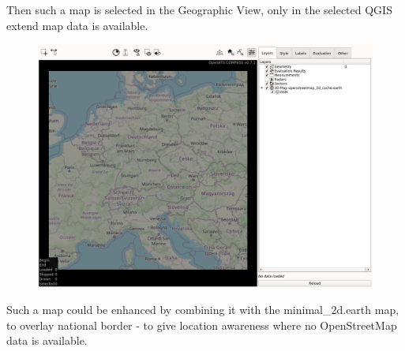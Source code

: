 Then such a map is selected in the Geographic View, only in the selected QGIS extend map data is available.

\begin{figure}[H]
    \hspace*{-2.5cm}
    \includegraphics[width=19cm,frame]{figures/geoview_qgis_osm1.png}
\end{figure}

Such a map could be enhanced by combining it with the minimal\_2d.earth map, to overlay national border - to give location awareness where no OpenStreetMap data is available.

